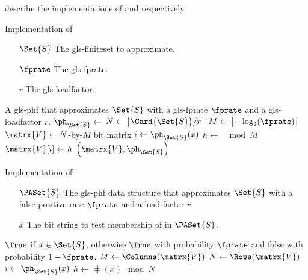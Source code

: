 \documentclass[ ../main.tex]{subfiles}
\begin{document}
 describe the implementations of \MakeApproxSet and \Contains respectively.
\begin{algorithm}[h]
    \caption{Implementation of \protect\MakeApproxSet}
    \label{alg:PHF}
    \KwIn
    {
        \begin{itemize}
            \item[$\Set{S}$] The \gls{gls-finiteset} to approximate.
            \item[$\fprate$] The \gls{gls-fprate}.
            \item[$r$] The \gls{gls-loadfactor}.
        \end{itemize}
    }
    \KwOut
    {
        A \gls{gls-phf} that approximates $\Set{S}$ with a \gls{gls-fprate} $\fprate$ and a \gls{gls-loadfactor} $r$.
    }
    {
        $\ph_{\Set{S}} \gets$ \;
        $N \gets \left\lceil \Card{\Set{S}} / r \right\rceil$\;
        $M \gets \left\lceil -\log_2\!\left(\fprate\right) \right\rceil$\;
        $\matrx{V} \gets N$-by-$M$ bit matrix\;
        {
            $i \gets \ph_{\Set{S}}\!\left(x\right)$\;
            $h \gets$ $\mod M$\;
            $\matrx{V}\!\left[i\right] \gets h$\;
        }
        \Return $\left(\matrx{V}, \ph_{\Set{S}}\right)$\;
    }
\end{algorithm}
\begin{algorithm}[h]
    \caption{Implementation of \protect\Contains}
    \label{alg:PHF_has}
    \KwIn
    {
        \begin{enumerate}
            \item[$\PASet{S}$] The \gls{gls-phf} data structure that approximates $\Set{S}$ with a false positive rate $\fprate$ and a load factor $r$.
            \item[$x$] The bit string to test membership of in $\PASet{S}$.
        \end{enumerate}
    }
    \KwOut
    {
        $\True$ if $x \in \Set{S}$, otherwise $\True$ with probability $\fprate$ and false with probability $1 - \fprate$.
    }
    {
        $M \gets \Columns(\matrx{V})$\;
        $N \gets \Rows(\matrx{V})$\;
        $i \gets \ph_{\Set{S}}\!\left(x\right)$\;
        $h \gets \hash(x) \mod N$\;
        \;
    }
\end{algorithm}
\end{document}
